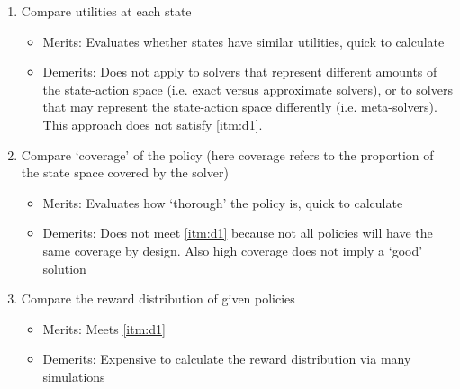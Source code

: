     \begin{enumerate}
        \item Compare utilities at each state \label{itm:i1}
        \begin{itemize}
            \item Merits: Evaluates whether states have similar utilities, quick to calculate 
            \item Demerits: Does not apply to solvers that represent different amounts of the state-action space (i.e. exact versus approximate solvers), or to solvers that may represent the state-action space differently (i.e. meta-solvers). This approach does not satisfy \ref{itm:d1}.
        \end{itemize} 
        \item Compare `coverage' of the policy (here coverage refers to the proportion of the state space covered by the solver) \label{itm:i2}
        \begin{itemize}
            \item Merits: Evaluates how `thorough' the policy is, quick to calculate 
            \item Demerits: Does not meet \ref{itm:d1} because not all policies will have the same coverage by design. Also high coverage does not imply a `good' solution
        \end{itemize}
        \item Compare the reward distribution of given policies \label{itm:i3}
        \begin{itemize}
            \item Merits: Meets \ref{itm:d1}
            \item Demerits: Expensive to calculate the reward distribution via many simulations
        \end{itemize}
    \end{enumerate}
